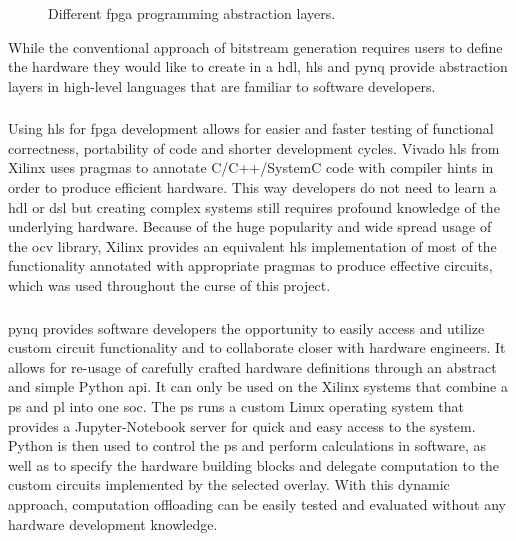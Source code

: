 \documentclass{scrartcl}
\begin{document}
\begin{figure}[h]
    \caption{Different \gls{fpga} programming abstraction layers.}%
    \label{fig:programming}%
\end{figure}

While the conventional approach of bitstream generation requires users to define
the hardware they would like to create in a \gls{hdl}, \gls{hls} and \gls{pynq}
provide abstraction layers in high-level languages that are familiar to software
developers.


\subsubsection{}

Using \gls{hls} for \gls{fpga} development allows for easier and faster testing
of functional correctness, portability of code and shorter development cycles.
Vivado \gls{hls} from Xilinx uses pragmas to annotate C/C++/SystemC code with
compiler hints in order to produce efficient hardware. This way developers do
not need to learn a \gls{hdl} or \gls{dsl} but creating complex systems still
requires profound knowledge of the underlying hardware. Because of the huge
popularity and wide spread usage of the \gls{ocv} library, Xilinx provides an
equivalent \gls{hls} implementation of most of the functionality annotated with
appropriate pragmas to produce effective circuits, which was used throughout the
curse of this project.


\subsubsection{}

\gls{pynq} provides software developers the opportunity to easily access and
utilize custom circuit functionality and to collaborate closer with hardware
engineers. It allows for re-usage of carefully crafted hardware definitions
through an abstract and simple Python \gls{api}. It can only be used on the
Xilinx systems that combine a \gls{ps} and \gls{pl} into one \gls{soc}. The
\gls{ps} runs a custom Linux operating system that provides a Jupyter-Notebook
server for quick and easy access to the system. Python is then used to control
the \gls{ps} and perform calculations in software, as well as to specify the
hardware building blocks and delegate computation to the custom circuits
implemented by the selected overlay. With this dynamic approach, computation
offloading can be easily tested and evaluated without any hardware development
knowledge.
\end{document}
